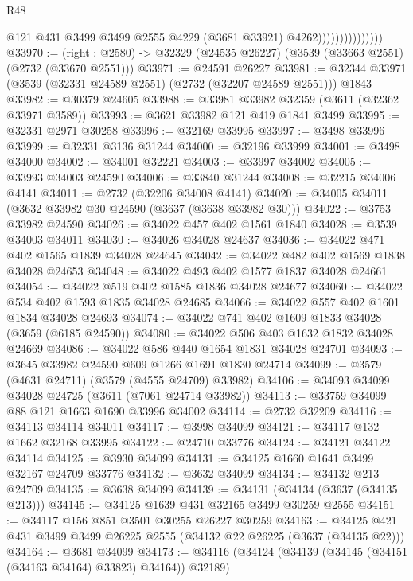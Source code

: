 \begin{lexlean}{R48}
\begin{coremodule}
                                  @121
                                  @431
                                  @3499
                                  @3499
                                  @2555
                                  @4229
                                  (@3681 @33921)
                                  @4262)))))))))))))))
@33970 := (right : @2580) -> @32329 (@24535 @26227) (@3539 (@33663 @2551) (@2732 (@33670 @2551)))
@33971 := @24591 @26227
@33981 := @32344 @33971 (@3539 (@32331 @24589 @2551) (@2732 (@32207 @24589 @2551))) @1843
@33982 := @30379 @24605
@33988 := @33981 @33982 @32359 (@3611 (@32362 @33971 @3589))
@33993 := @3621 @33982 @121 @419 @1841 @3499
@33995 := @32331 @2971 @30258
@33996 := @32169 @33995
@33997 := @3498 @33996
@33999 := @32331 @3136 @31244
@34000 := @32196 @33999
@34001 := @3498 @34000
@34002 := @34001 @32221
@34003 := @33997 @34002
@34005 := @33993 @34003 @24590
@34006 := @33840 @31244
@34008 := @32215 @34006 @4141
@34011 := @2732 (@32206 @34008 @4141)
@34020 := @34005 @34011 (@3632 @33982 @30 @24590 (@3637 (@3638 @33982 @30)))
@34022 := @3753 @33982 @24590
@34026 := @34022 @457 @402 @1561 @1840
@34028 := @3539 @34003 @34011
@34030 := @34026 @34028 @24637
@34036 := @34022 @471 @402 @1565 @1839 @34028 @24645
@34042 := @34022 @482 @402 @1569 @1838 @34028 @24653
@34048 := @34022 @493 @402 @1577 @1837 @34028 @24661
@34054 := @34022 @519 @402 @1585 @1836 @34028 @24677
@34060 := @34022 @534 @402 @1593 @1835 @34028 @24685
@34066 := @34022 @557 @402 @1601 @1834 @34028 @24693
@34074 := @34022 @741 @402 @1609 @1833 @34028 (@3659 (@6185 @24590))
@34080 := @34022 @506 @403 @1632 @1832 @34028 @24669
@34086 := @34022 @586 @440 @1654 @1831 @34028 @24701
@34093 := @3645 @33982 @24590 @609 @1266 @1691 @1830 @24714
@34099 := @3579 (@4631 @24711) (@3579 (@4555 @24709) @33982)
@34106 := @34093 @34099 @34028 @24725 (@3611 (@7061 @24714 @33982))
@34113 := @33759 @34099 @88 @121 @1663 @1690 @33996 @34002
@34114 := @2732 @32209
@34116 := @34113 @34114 @34011
@34117 := @3998 @34099
@34121 := @34117 @132 @1662 @32168 @33995
@34122 := @24710 @33776
@34124 := @34121 @34122 @34114
@34125 := @3930 @34099
@34131 := @34125 @1660 @1641 @3499 @32167 @24709 @33776
@34132 := @3632 @34099
@34134 := @34132 @213 @24709
@34135 := @3638 @34099
@34139 := @34131 (@34134 (@3637 (@34135 @213)))
@34145 := @34125 @1639 @431 @32165 @3499 @30259 @2555
@34151 := @34117 @156 @851 @3501 @30255 @26227 @30259
@34163 := @34125 @421 @431 @3499 @3499 @26225 @2555 (@34132 @22 @26225 (@3637 (@34135 @22)))
@34164 := @3681 @34099
@34173 := @34116 (@34124 (@34139 (@34145 (@34151 (@34163 @34164) @33823) @34164)) @32189)

\end{coremodule}
\end{lexlean}

